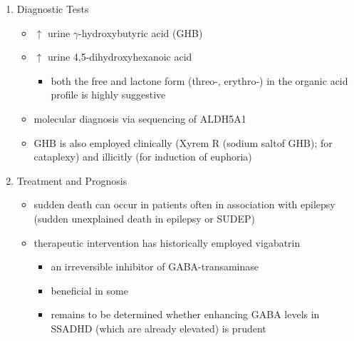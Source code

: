 \documentclass[12pt]{scrartcl}
\begin{document}
\begin{enumerate}
\item Diagnostic Tests
\label{sec:orgc69bb86}
\begin{itemize}
\item \(\uparrow\) urine \(\gamma\)-hydroxybutyric acid (GHB)
\item \(\uparrow\) urine 4,5-dihydroxyhexanoic acid
\begin{itemize}
\item both the free and lactone form (threo-, erythro-) in the organic acid profile
is highly suggestive
\end{itemize}
\item molecular diagnosis via sequencing of ALDH5A1
\item GHB is also employed clinically (Xyrem R (sodium saltof GHB); for
cataplexy) and illicitly (for induction of euphoria)
\end{itemize}

\item Treatment and Prognosis
\label{sec:org1d0803c}
\begin{itemize}
\item sudden death can occur in patients often in association with
epilepsy (sudden unexplained death in epilepsy or SUDEP)
\item therapeutic intervention has historically employed vigabatrin
\begin{itemize}
\item an irreversible inhibitor of GABA-transaminase
\item beneficial in some
\item remains to be determined whether enhancing GABA levels in SSADHD
(which are already elevated) is prudent
\end{itemize}
\end{itemize}
\end{enumerate}
\end{document}

